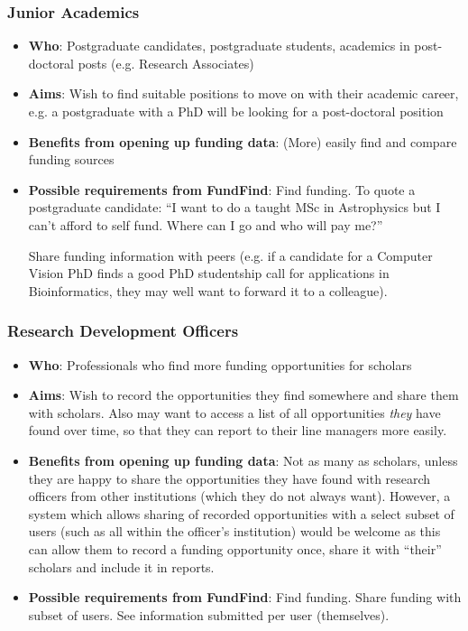 \subsubsection{Junior Academics}
\begin{itemize}
 \item \textbf{Who}: Postgraduate candidates, postgraduate students, academics in post-doctoral posts (e.g. Research Associates)
 \item \textbf{Aims}: Wish to find suitable positions to move on with their academic career, e.g. a postgraduate with a PhD will be looking for a post-doctoral position
 \item \textbf{Benefits from opening up funding data}: (More) easily find and compare funding sources
 \item \textbf{Possible requirements from FundFind}: Find funding. To quote a postgraduate candidate: ``I want to do a taught MSc in Astrophysics but I can't afford to self fund. Where can I go and who will pay me?''
 
 Share funding information with peers (e.g. if a candidate for a Computer Vision PhD finds a good PhD studentship call for applications in Bioinformatics, they may well want to forward it to a colleague).
\end{itemize}

\subsubsection{Research Development Officers}
\label{audience-research-officers}
\begin{itemize}
 \item \textbf{Who}: Professionals who find more funding opportunities for scholars
 \item \textbf{Aims}: Wish to record the opportunities they find somewhere and share them with scholars. Also may want to access a list of all opportunities \emph{they} have found over time, so that they can report to their line managers more easily.
 \item \textbf{Benefits from opening up funding data}: Not as many as scholars, unless they are happy to share the opportunities they have found with research officers from other institutions (which they do not always want). However, a system which allows sharing of recorded opportunities with a select subset of users (such as all within the officer's institution) would be welcome as this can allow them to record a funding opportunity once, share it with ``their'' scholars and include it in reports.
 \item \textbf{Possible requirements from FundFind}: Find funding. Share funding with subset of users. See information submitted per user (themselves).
\end{itemize}

